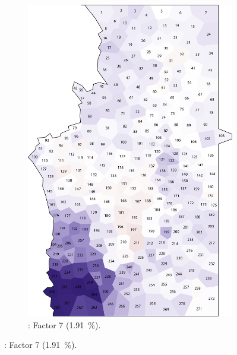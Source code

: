 \documentclass[output=paper]{LSP/langsci}
\begin{document}
\begin{figure}
\begin{subfigure}[t]{0.3\textwidth}
\includegraphics[width=\textwidth]{illustrations/pickl_fig8}
\caption{: Factor 7 (1.91~\%).}
\label{fig:8}
\end{subfigure}
\end{figure}
\end{document}
